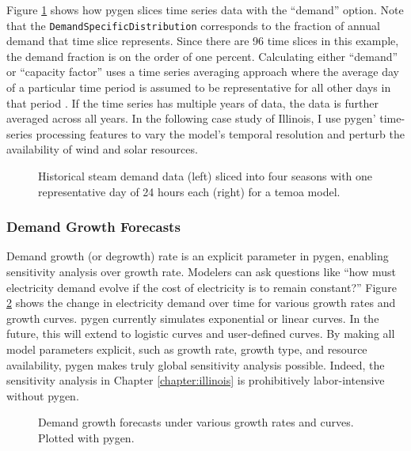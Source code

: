 Figure \ref{fig:steam-timeslice} shows how \gls{pygen} slices time series
data with the ``demand'' option. Note that the \texttt{DemandSpecificDistribution}
corresponds to the fraction of annual demand that time slice represents. Since
there are 96 time slices in this example, the demand fraction is on the order of one
percent. Calculating either ``demand'' or ``capacity factor'' uses a time series
averaging approach where the average day of a particular time period is assumed
to be representative for all other days in that period \cite{kotzur_impact_2018}.
If the time series has multiple years of data, the data is further averaged
across all years. In the following case study of Illinois, I use \gls{pygen}'
time-series processing features to vary the model's temporal resolution and perturb
the availability of wind and solar resources.

\begin{figure}[H]
  \resizebox{\textwidth}{!}{}
  \caption{Historical steam demand data (left) sliced into four seasons with one
  representative day of 24 hours each (right) for a \gls{temoa} model.}
  \label{fig:steam-timeslice}
\end{figure}

\subsubsection{Demand Growth Forecasts}
Demand growth (or degrowth) rate is an explicit parameter in \gls{pygen}, enabling
sensitivity analysis over growth rate. Modelers can ask questions like
``how must electricity demand evolve if the cost of electricity is to remain
constant?'' Figure \ref{fig:dem-growth} shows the change in electricity demand
over time for various growth rates and growth curves. \gls{pygen} currently simulates
exponential or linear curves. In the future, this will extend to logistic curves
and user-defined curves. By making all model parameters explicit, such as growth
rate, growth type, and resource availability, \gls{pygen} makes truly global sensitivity
analysis possible. Indeed, the sensitivity analysis in Chapter \ref{chapter:illinois}
is prohibitively labor-intensive without \gls{pygen}.

\begin{figure}[H]
  \centering
  \resizebox{0.8\textwidth}{!}{}
  \caption{Demand growth forecasts under various growth rates and curves. Plotted
  with \gls{pygen}.}
  \label{fig:dem-growth}
\end{figure}
